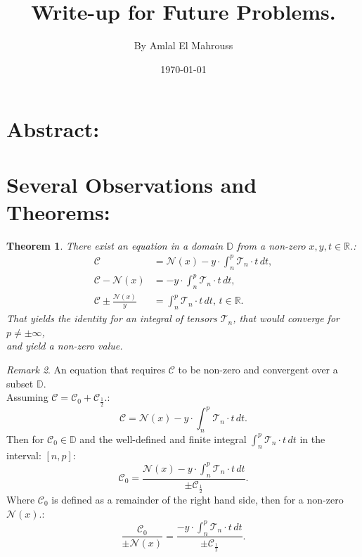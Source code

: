 \documentclass[10pt]{article}
\title{%
	\vspace{-1.5em}%
	\large\textbf{Write-up for Future Problems.}%
}
\author{By Amlal El Mahrouss}
\date{\today}
\theoremstyle{plain}
\newtheorem{theorem}{Theorem}[section]
\theoremstyle{definition}
\theoremstyle{remark}
\newtheorem{remark}[theorem]{Remark}
\begin{document}
	
	\maketitle
	\tableofcontents
	\newpage

\section{Abstract:}

\section{Several Observations and Theorems:}

\begin{theorem}
There exist an equation in a domain $\mathbb{D}$ from a non-zero $x, y, t \in \mathbb{R}$.:
\begin{align*}
    \mathcal{C} &= \mathcal{N}(x) - y \cdot \int_{n}^{p} \mathcal{T}_{n} \cdot t \, dt,\\
    \mathcal{C} - \mathcal{N}(x) &= -y \cdot \int_{n}^{p} \mathcal{T}_{n} \cdot t \, dt,\\
    \mathcal{C} \pm \frac{\mathcal{N}(x)}{y} &= \int_{n}^{p} \mathcal{T}_{n} \cdot t \, dt, \, t \in \mathbb{R}.
\end{align*}
That yields the identity for an integral of tensors $\mathcal{T}_n$, that would converge for $p \neq \pm \infty$,\\ and yield a non-zero value.
\end{theorem}

\begin{remark}
An equation that requires $\mathcal{C}$ to be non-zero and convergent over a subset $\mathbb{D}$.\\
Assuming $\mathcal{C} = \mathcal{C}_{0} + \mathcal{C}_{\frac{1}{2}}.$:
\begin{equation}
	\mathcal{C} = \mathcal{N}(x) - y \cdot \int_{n}^{p} \mathcal{T}_{n} \cdot t \, dt.
\end{equation}
Then for  $\mathcal{C}_0 \in \mathbb{D}$ and the well-defined and finite integral $\int_{n}^{p} \mathcal{T}_{n} \cdot t \, dt$ in the interval: $[n, p]$:
\begin{equation}
	\mathcal{C}_{0} = \frac{\mathcal{N}(x) - y \cdot \int_{n}^{p} \mathcal{T}_{n} \cdot t \, dt}{\pm \mathcal{C}_{\frac{1}{2}}}.
\end{equation}
Where $\mathcal{C}_{0}$ is defined as a remainder of the right hand side, then for a non-zero $\mathcal{N}(x)$.:
\begin{equation}
	\frac{\mathcal{C}_{0}}{\pm \mathcal{N}(x) } = \frac{-y \cdot \int_{n}^{p} \mathcal{T}_{n} \cdot t \, dt}{\pm \mathcal{C}_{\frac{1}{2}}}.
\end{equation}
\end{remark}
\end{document}

